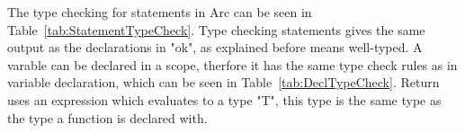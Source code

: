 The type checking for statements in Arc can be seen in Table~\ref{tab:StatementTypeCheck}. Type checking statements gives the same output as the declarations in "ok", as explained before means well-typed. A varable can be declared in a scope, therfore it has the same type check rules as in variable declaration, which can be seen in Table~\ref{tab:DeclTypeCheck}. Return uses an expression which evaluates to a type "T", this type is the same type as the type a function is declared with.

